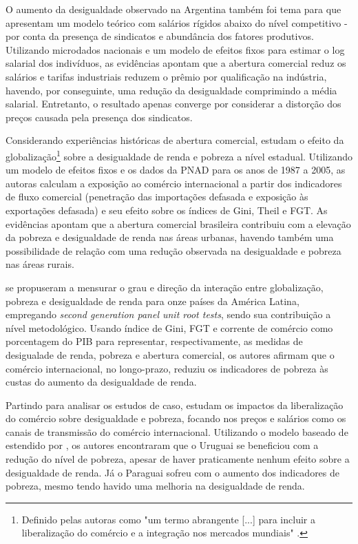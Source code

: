 O aumento da desigualdade observado na Argentina também foi tema para \textcite{galianiporto11} que apresentam um modelo teórico com salários rígidos abaixo do nível competitivo - por conta da presença de sindicatos e abundância dos fatores produtivos. Utilizando microdados nacionais e um modelo de efeitos fixos para estimar o log salarial dos indivíduos, as evidências apontam que a abertura comercial reduz os salários e tarifas industriais reduzem o prêmio por qualificação na indústria, havendo, por conseguinte, uma redução da desigualdade comprimindo a média salarial. Entretanto, o resultado apenas converge por considerar a distorção dos preços causada pela presença dos sindicatos.

Considerando experiências históricas de abertura comercial, \textcite{castilho12} estudam o efeito da globalização\footnote{Definido pelas autoras como "um termo abrangente [...] para incluir a liberalização do comércio e a integração nos mercados mundiais" \cite{castilho12}.} sobre a desigualdade de renda e pobreza a nível estadual. Utilizando um modelo de efeitos fixos e os dados da PNAD para os anos de 1987 a 2005, as autoras calculam a exposição ao comércio internacional a partir dos indicadores de fluxo comercial (penetração das importações defasada e exposição às exportações defasada) e seu efeito sobre os índices de Gini, Theil e FGT. As evidências apontam que a abertura comercial brasileira contribuiu com a elevação da pobreza e desigualdade de renda nas áreas
urbanas, havendo também uma possibilidade de relação com uma redução observada na desigualdade e pobreza nas áreas rurais.

\textcite{bayar17} se propuseram a mensurar o grau e direção da interação entre globalização, pobreza e desigualdade de renda para onze países da América Latina, empregando \textit{second generation panel unit root tests}, sendo sua contribuição a nível metodológico. Usando índice de Gini, FGT e corrente de comércio como porcentagem do PIB para representar, respectivamente, as medidas de desigualade de renda, pobreza e abertura comercial, os autores afirmam que o comércio internacional, no longo-prazo, reduziu os indicadores de pobreza às custas do aumento da desigualdade de renda.

Partindo para analisar os estudos de caso, \textcite{borrazetal12} estudam os impactos da liberalização do comércio sobre desigualdade e pobreza, focando nos preços e salários como os canais de transmissão do comércio internacional. Utilizando o modelo baseado de \textcite{dixit80} estendido por \textcite{porto06}, os autores encontraram que o Uruguai se beneficiou com a redução do nível de pobreza, apesar de haver praticamente nenhum efeito sobre a desigualdade de renda. Já o Paraguai sofreu com o aumento dos indicadores de pobreza, mesmo tendo havido uma melhoria na desigualdade de renda.

